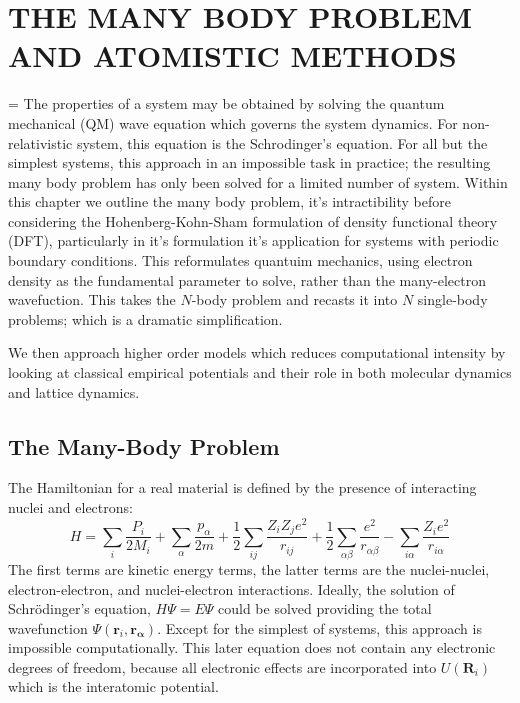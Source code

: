 \chapter{THE MANY BODY PROBLEM AND ATOMISTIC METHODS}
\hfuzz=20pt
\vfuzz=20pt
\vbadness=\maxdimen
The properties of a system may be obtained by solving the quantum mechanical (QM) wave equation which governs the system dynamics.  For non-relativistic system, this equation is the Schrodinger's equation.  For all but the simplest systems, this approach in an impossible task in practice; the resulting many body problem has only been solved for a limited number of system.  Within this chapter we outline the many body problem, it's intractibility before considering the Hohenberg-Kohn-Sham formulation of density functional theory (DFT), particularly in it's formulation it's application for systems with periodic boundary conditions.  This reformulates quantuim mechanics, using electron density as the fundamental parameter to solve, rather than the many-electron wavefuction.  This takes the $N$-body problem and recasts it into $N$ single-body problems; which is a dramatic simplification.

We then approach higher order models which reduces computational intensity by looking at classical empirical potentials and their role in both molecular dynamics and lattice dynamics.

\section{The Many-Body Problem}

The Hamiltonian for a real material is defined by the presence of interacting nuclei and electrons:
\begin{equation}
	H = \sum_i \frac{P_i}{2M_i}
	    + \sum_\alpha \frac{p_\alpha}{2m}
	    + \frac{1}{2} \sum_{ij} \frac{Z_i Z_j e^2}{r_{ij}}
	    + \frac{1}{2} \sum_{\alpha\beta} \frac{e^2}{r_{\alpha\beta}}
	    - \sum_{i\alpha} \frac{Z_i e^2}{r_{i\alpha}}
\end{equation}
The first terms are kinetic energy terms, the latter terms are the nuclei-nuclei, electron-electron, and nuclei-electron interactions.
Ideally, the solution of Schr\"{o}dinger's equation, $H\Psi=E\Psi$ could be solved providing the total wavefunction $\Psi(\bm{r}_i,\bm{r_\alpha})$.
Except for the simplest of systems, this approach is impossible computationally.
This later equation does not contain any electronic degrees of freedom, because all electronic effects are incorporated into $U(\bm{R}_i)$ which is the interatomic potential.


